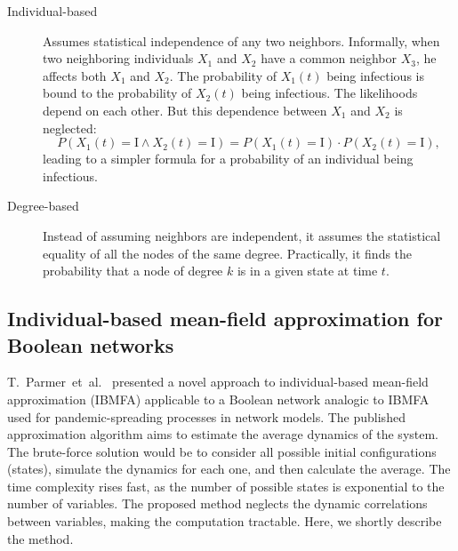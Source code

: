 \documentclass[
	digital, oneside, nosansbold, nocolorbold, nolot, nolof
]{fithesis4}
\theoremstyle{definition}
\theoremstyle{definition}
\begin{document}
\begin{description}
    \item[Individual-based] Assumes statistical independence of any two
        neighbors. Informally, when two neighboring individuals $X_1$ and $X_2$
        have a common neighbor $X_3$, he affects both $X_1$ and $X_2$. The
        probability of $X_1(t)$ being infectious is bound to the probability of
        $X_2(t)$ being infectious. The likelihoods depend on each other. But
        this dependence between $X_1$ and $X_2$ is neglected:
        \[
            P(X_1(t) = \text{I} \land X_2(t) = \text{I}) =
            P(X_1(t) = \text{I}) \cdot P(X_2(t) = \text{I}),
        \]
        leading to a simpler formula for a probability of an individual being
        infectious.
    \item[Degree-based] Instead of assuming neighbors are independent, it
        assumes the statistical equality of all the nodes of the same degree.
        Practically, it finds the probability that a node of degree $k$ is in
        a given state at time $t$.
\end{description}

\subsection{Individual-based mean-field approximation for Boolean networks}
\label{section:IBMFA}

T.~Parmer~et~al.~\cite{infl_max_BN} presented a novel approach to
individual-based mean-field approximation (IBMFA) applicable to a Boolean
network analogic to IBMFA used for pandemic-spreading processes in network
models. The published approximation algorithm aims to estimate the average
dynamics of the system. The brute-force solution would be to consider all
possible initial configurations (states), simulate the dynamics for each one,
and then calculate the average. The time complexity rises fast, as the number
of possible states is exponential to the number of variables.  The proposed
method neglects the dynamic correlations between variables, making the
computation tractable. Here, we shortly describe the method.
\end{document}
